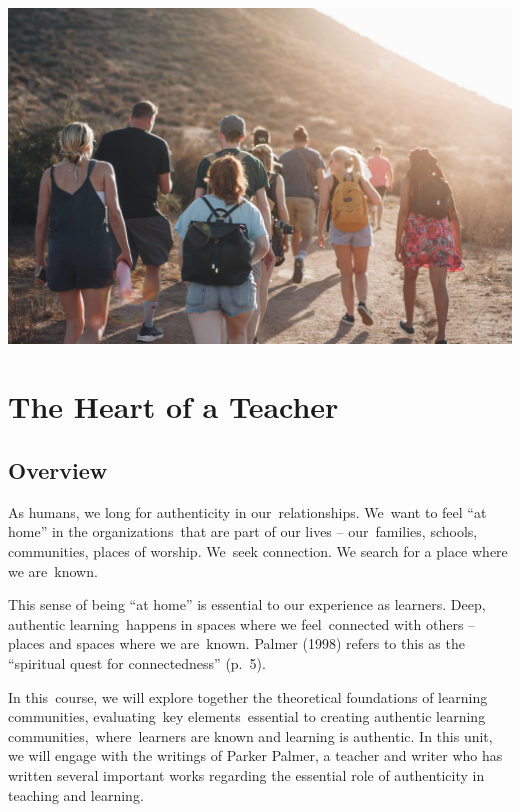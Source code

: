 \documentclass[
]{book}
\begin{document}
\includegraphics{assets/community/luke-porter-NEqEC7qa9FM-unsplash.jpg}

\hypertarget{the-heart-of-a-teacher}{%
\chapter{The Heart of a Teacher}\label{the-heart-of-a-teacher}}

\hypertarget{overview}{%
\section*{Overview}\label{overview}}

As humans, we long for authenticity in our~relationships. We~want to feel ``at home'' in the organizations~that are part of our lives -- our~families, schools, communities, places of worship. We~seek connection. We search for a place where we are~known.

This sense of being ``at home'' is essential to our experience as learners. Deep, authentic learning~happens in spaces where we feel~connected with others -- places and spaces where we are~known. Palmer (1998) refers to this as the ``spiritual quest for connectedness'' (p.~5).

In this~course, we will explore together the theoretical foundations of learning communities, evaluating~key elements~essential to creating authentic learning communities,~where~learners are known and learning is authentic. In this unit, we will engage with the writings of Parker Palmer, a teacher and writer who has written several important works regarding the essential role of authenticity in teaching and learning.
\end{document}
